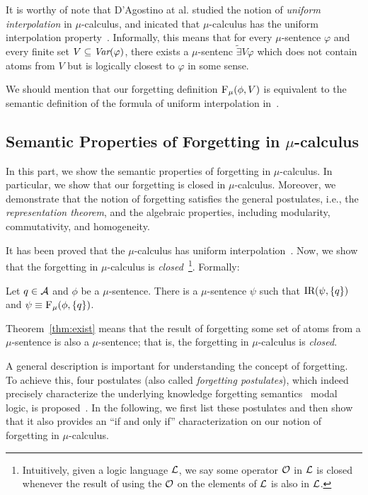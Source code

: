 \documentclass[runningheads]{llncs}
\begin{document}
It is worthy of note that D'Agostino at al. studied the notion of \emph{uniform interpolation} in $\mu$-calculus, and inicated that $\mu$-calculus has the uniform interpolation property~\cite{d1996uniform,d2006modal}. Informally, this means that for every $\mu$-sentence $\varphi$ and every finite set $V\subseteq \textit{Var}(\varphi)$, there exists a $\mu$-sentenc $\widetilde{\exists}V \varphi$ which does not contain atoms from $V$ but is logically closest to $\varphi$ in some sense.

We should mention that our forgetting definition ${\textsc{F}_{\textsc{$\mu$}}}(\phi, V)$ is equivalent to the semantic definition of the formula of uniform interpolation in~\cite{d2006modal}.

\subsection{Semantic Properties of Forgetting in $\mu$-calculus}
In this part, we show the semantic properties of forgetting in $\mu$-calculus. In particular, we show that our forgetting is closed in $\mu$-calculus. Moreover, we demonstrate that the notion of forgetting satisfies the general postulates, i.e., the \emph{representation theorem}, and the algebraic properties, including modularity, commutativity, and homogeneity.

It has been proved that the $\mu$-calculus has uniform interpolation~\cite{d2000logical,d1996uniform}. Now, we show that the forgetting in $\mu$-calculus is \emph{closed}~\footnote{Intuitively, given a logic language ${\cal L}$, we say some operator ${\cal O}$ in ${\cal L}$ is closed whenever the result of using the ${\cal O}$ on the elements of ${\cal L}$ is also in ${\cal L}$.}. Formally:

\begin{theorem} \label{thm:exist}
Let $q \in \cal A$ and $\phi$ be a $\mu$-sentence. There is a $\mu$-sentence $\psi$ such that $\textrm{IR}(\psi, \{q\})$ and $\psi \equiv {\textsc{F}_{\textsc{$\mu$}}}(\phi, \{q\})$.
\end{theorem}

Theorem~\ref{thm:exist} means that the result of forgetting some set of atoms from a $\mu$-sentence is also a $\mu$-sentence; that is, the forgetting in $\mu$-calculus is \emph{closed}.



A general description is important for understanding the concept of forgetting.
To achieve this, four postulates (also called \emph{forgetting postulates}), which indeed precisely characterize the underlying knowledge forgetting semantics  \SFive\ modal logic, is proposed~\cite{Yan:AIJ:2009}.
In the following, we first list these postulates and then show that it also provides an “if and only if” characterization on our notion of forgetting in $\mu$-calculus.
\end{document}

